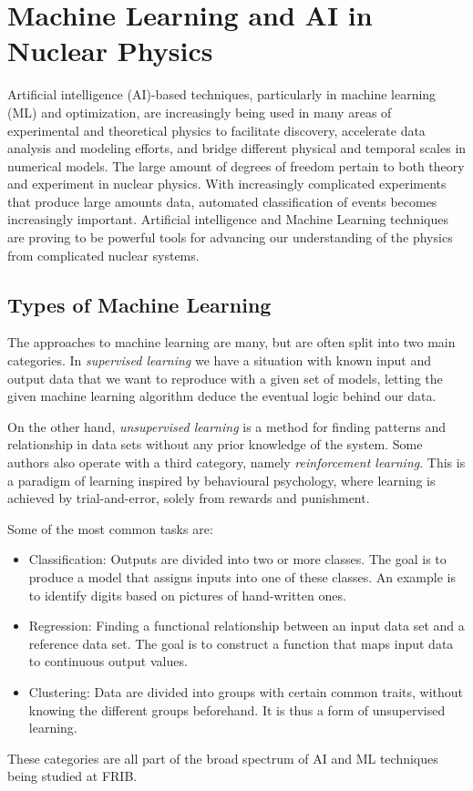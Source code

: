 \documentclass[%
10pt]{article}
\begin{document}
\section{Machine Learning and AI in Nuclear Physics}


Artificial intelligence (AI)-based techniques, particularly in machine
learning (ML) and optimization, are increasingly being used in many areas
of experimental and theoretical physics to facilitate discovery,
accelerate data analysis and modeling efforts, and bridge different
physical and temporal scales in numerical models.
The large amount of degrees of freedom pertain to both theory and experiment in nuclear physics. With increasingly complicated experiments that produce large amounts data, automated classification of events becomes increasingly important. 
Artificial intelligence and Machine Learning   techniques are proving to be powerful tools for advancing our
understanding of the physics from complicated nuclear systems. 



\subsection{Types of Machine Learning}



The approaches to machine learning are many, but are often split into two main categories. 
In \emph{supervised learning} we have a situation with known input and output data that we want to reproduce with a given set of models, letting the given machine learning algorithm deduce the eventual logic behind our data. 

On the other hand, \emph{unsupervised learning}
is a method for finding patterns and relationship in data sets without any prior knowledge of the system.
Some authors also operate with a third category, namely \emph{reinforcement learning}. This is a paradigm 
of learning inspired by behavioural psychology, where learning is achieved by trial-and-error, 
solely from rewards and punishment.

Some of the most common tasks are:

\begin{itemize}
  \item Classification: Outputs are divided into two or more classes. The goal is to   produce a model that assigns inputs into one of these classes. An example is to identify  digits based on pictures of hand-written ones. 

  \item Regression: Finding a functional relationship between an input data set and a reference data set.   The goal is to construct a function that maps input data to continuous output values.

  \item Clustering: Data are divided into groups with certain common traits, without knowing the different groups beforehand.  It is thus a form of unsupervised learning.
\end{itemize}
These categories are all part of the broad spectrum of AI and ML techniques being studied at FRIB. 
\end{document}
